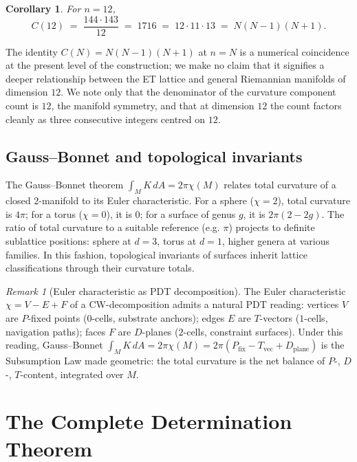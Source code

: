 \documentclass[11pt,a4paper]{article}
\newtheorem{corollary}[theorem]{Corollary}
\theoremstyle{definition}
\theoremstyle{remark}
\newtheorem{remark}[theorem]{Remark}
\begin{document}
\begin{corollary}\label{cor:1716}
For $n=12$,
\[
C(12) \;=\; \frac{144\cdot 143}{12} \;=\; 1716 \;=\; 12\cdot 11\cdot 13 \;=\; N(N-1)(N+1).
\]
\end{corollary}

The identity $C(N) = N(N-1)(N+1)$ at $n=N$ is a numerical coincidence at the present level of the construction; we make no claim that it signifies a deeper relationship between the ET lattice and general Riemannian manifolds of dimension $12$. We note only that the denominator of the curvature component count is $12$, the manifold symmetry, and that at dimension $12$ the count factors cleanly as three consecutive integers centred on $12$.

\subsection{Gauss--Bonnet and topological invariants}

The Gauss--Bonnet theorem $\int_{M}K\,dA = 2\pi\chi(M)$ relates total curvature of a closed $2$-manifold to its Euler characteristic. For a sphere ($\chi=2$), total curvature is $4\pi$; for a torus ($\chi=0$), it is $0$; for a surface of genus $g$, it is $2\pi(2-2g)$. The ratio of total curvature to a suitable reference (e.g. $\pi$) projects to definite sublattice positions: sphere at $d=3$, torus at $d=1$, higher genera at various families. In this fashion, topological invariants of surfaces inherit lattice classifications through their curvature totals.

\begin{remark}[Euler characteristic as PDT decomposition]
The Euler characteristic $\chi = V - E + F$ of a CW-decomposition admits a natural PDT reading: vertices $V$ are $P$-fixed points ($0$-cells, substrate anchors); edges $E$ are $T$-vectors ($1$-cells, navigation paths); faces $F$ are $D$-planes ($2$-cells, constraint surfaces). Under this reading, Gauss--Bonnet $\int_{M} K\,dA = 2\pi\chi(M) = 2\pi(P_{\text{fix}} - T_{\text{vec}} + D_{\text{plane}})$ is the Subsumption Law made geometric: the total curvature is the net balance of $P$-, $D$-, $T$-content, integrated over $M$.
\end{remark}

\section{The Complete Determination Theorem}\label{sec:secret26}
\end{document}
